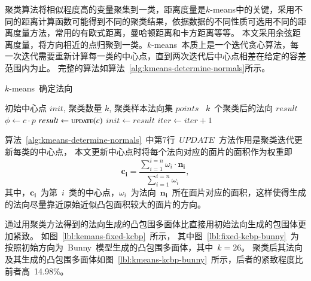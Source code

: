 聚类算法将相似程度高的变量聚集到一类，距离度量是$k$-means中的关键，采用不同的距离计算函数可能得到不同的聚类结果，依据数据的不同性质可选用不同的距离度量方法，常用的有欧式距离，曼哈顿距离和卡方距离等等。
本文采用余弦距离度量，将方向相近的点归聚到一类。$k$-means~本质上是一个迭代贪心算法，每一次迭代需要重新计算每一类的中心点，直到两次迭代后中心点相差在给定的容差范围内为止。
完整的算法如算法~\ref{alg:kmeans-determine-normals}所示。

\begin{algorithm}
\small
\caption{$k$-means~确定法向}
\label{alg:kmeans-determine-normals}
\begin{algorithmic}[1]
\Require
初始中心点 $init$, 聚类数量 $k$, 聚类样本法向集 $points$
\Ensure
~$k$~个聚类后的法向 $result$
        \State $\phi \gets c \cdot p$ 
    \EndFor
    \State $result \gets \Call{update}{c}$ 
        \State {}
        \State {}
    \Else
        \State $init \gets result $
        \State $iter \gets iter+1 $
    \EndIf
    \EndFor
  \EndFor
\EndFunction
\end{algorithmic}
\end{algorithm}

算法~\ref{alg:kmeans-determine-normals}~中第7行~$UPDATE$~方法作用是聚类迭代更新每类的中心点，
本文更新中心点时将每个法向对应的面片的面积作为权重即
\begin{equation}
\label{equ:kmeans-update-center}
\bm{c_i}=\frac{\sum_{i=1}^{i=n} \omega_i \cdot \bm{n_i} } {\sum_{i=1}^{i=n} \omega_i}
,
\end{equation}
其中，$\bm{c_i}$~为第~$i$~类的中心点，$\omega_i$~为法向~$\bm{n_i}$~所在面片对应的面积，这样使得生成的法向尽量靠近原始近似凸包面积较大的面片的方向。

通过用聚类方法得到的法向生成的凸包围多面体比直接用初始法向生成的包围体更加紧致。
如图~\ref{lbl:kemans-fixed-kcbp}~所示， 
其中图~\ref{lbl:fixed-kcbp-bunny}~为按照初始方向为~Bunny~模型生成的凸包围多面体，其中~$k=26$。
聚类后其法向及其生成的凸包围多面体如图~\ref{lbl:kmeans-kcbp-bunny}~所示，后者的紧致程度比前者高~14.98\%。

